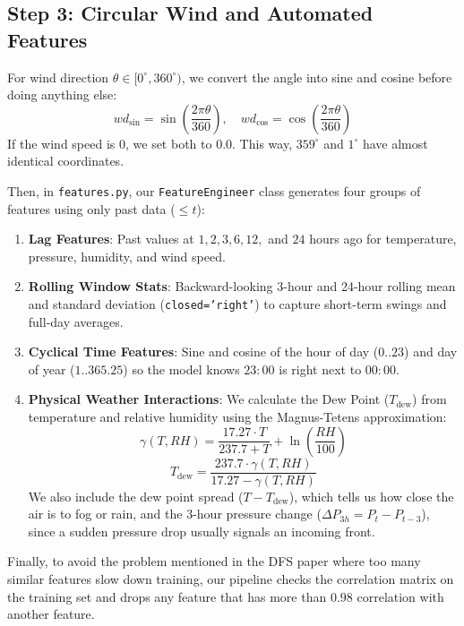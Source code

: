 \documentclass[conference]{IEEEtran}
\begin{document}
\subsection{Step 3: Circular Wind and Automated Features}
For wind direction $\theta \in [0^\circ, 360^\circ)$, we convert the angle into sine and cosine before doing anything else:
\begin{equation}
wd_{\sin} = \sin\left(\frac{2\pi \theta}{360}\right), \quad wd_{\cos} = \cos\left(\frac{2\pi \theta}{360}\right)
\end{equation}
If the wind speed is $0$, we set both to $0.0$. This way, $359^\circ$ and $1^\circ$ have almost identical coordinates.

Then, in \texttt{features.py}, our \texttt{FeatureEngineer} class generates four groups of features using only past data ($\le t$):
\begin{enumerate}
    \item \textbf{Lag Features}: Past values at $1, 2, 3, 6, 12,$ and $24$ hours ago for temperature, pressure, humidity, and wind speed.
    \item \textbf{Rolling Window Stats}: Backward-looking 3-hour and 24-hour rolling mean and standard deviation (\texttt{closed='right'}) to capture short-term swings and full-day averages.
    \item \textbf{Cyclical Time Features}: Sine and cosine of the hour of day ($0..23$) and day of year ($1..365.25$) so the model knows $23:00$ is right next to $00:00$.
    \item \textbf{Physical Weather Interactions}: We calculate the Dew Point ($T_{\text{dew}}$) from temperature and relative humidity using the Magnus-Tetens approximation:
    \begin{equation}
    \gamma(T, RH) = \frac{17.27 \cdot T}{237.7 + T} + \ln\left(\frac{RH}{100}\right)
    \end{equation}
    \begin{equation}
    T_{\text{dew}} = \frac{237.7 \cdot \gamma(T, RH)}{17.27 - \gamma(T, RH)}
    \end{equation}
    We also include the dew point spread ($T - T_{\text{dew}}$), which tells us how close the air is to fog or rain, and the 3-hour pressure change ($\Delta P_{3h} = P_t - P_{t-3}$), since a sudden pressure drop usually signals an incoming front.
\end{enumerate}
Finally, to avoid the problem mentioned in the DFS paper \cite{kanter2015} where too many similar features slow down training, our pipeline checks the correlation matrix on the training set and drops any feature that has more than $0.98$ correlation with another feature.
\end{document}
